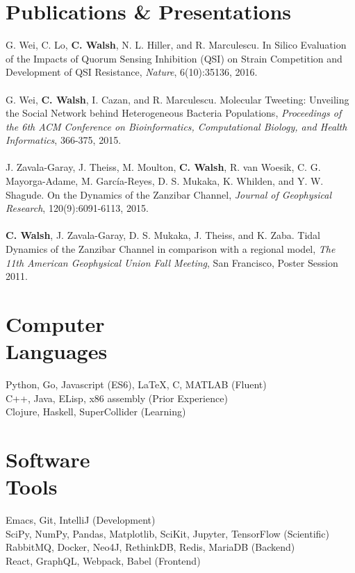 \documentclass[margin]{res}
\begin{document}
\begin{resume}
\vspace{10pt}
\section{Publications \& Presentations}
G. Wei, C. Lo, \textbf{C. Walsh}, N. L. Hiller, and R. Marculescu. In Silico Evaluation of the Impacts of Quorum Sensing Inhibition (QSI) on Strain Competition and Development of QSI Resistance, \textit{Nature}, 6(10):35136, 2016.
 \vspace{-4pt}
\\
\\
G. Wei, \textbf{C. Walsh}, I. Cazan, and R. Marculescu. Molecular Tweeting: Unveiling the Social Network behind Heterogeneous Bacteria Populations, \textit{Proceedings of the 6th ACM Conference on Bioinformatics, Computational Biology, and Health Informatics}, 366-375, 2015.
 \vspace{-4pt}
\\
\\
J. Zavala-Garay, J. Theiss, M. Moulton, \textbf{C. Walsh}, R. van Woesik, C. G. Mayorga-Adame, M. Garc\'ia-Reyes, D. S. Mukaka, K. Whilden, and Y. W. Shagude. On the Dynamics of the Zanzibar Channel, \textit{Journal of Geophysical Research}, 120(9):6091-6113, 2015.
 \vspace{-4pt}
\\
\\
\textbf{C. Walsh}, J. Zavala-Garay, D. S. Mukaka, J. Theiss, and K. Zaba. Tidal Dynamics of the Zanzibar Channel in comparison with a regional model, \textit{The 11th American Geophysical Union Fall Meeting}, San Francisco, Poster Session 2011.


\section{Computer \\ Languages}
Python, Go, Javascript (ES6), \LaTeX, C, MATLAB        \hfill (Fluent)\\
C++, Java, ELisp, x86 assembly    \hfill (Prior Experience)\\
Clojure, Haskell, SuperCollider   \hfill (Learning)

\section{Software \\ Tools}
Emacs, Git, IntelliJ   \hfill(Development)\\
SciPy, NumPy, Pandas, Matplotlib, SciKit, Jupyter, TensorFlow \hfill(Scientific)\\
RabbitMQ, Docker, Neo4J, RethinkDB, Redis, MariaDB  \hfill(Backend)\\
React, GraphQL, Webpack, Babel  \hfill(Frontend)



\end{resume}
\end{document}
